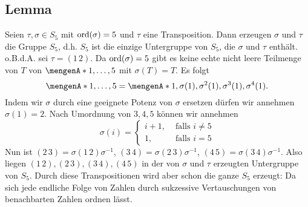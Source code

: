 \subsection[Lemma: Erzeuger von $S_5$]{Lemma} %
\label{sub:230}
Seien $\tau, \sigma \in S_5$ mit $\operatorname{ord}(\sigma)=5$ und $\tau$ eine Transposition. Dann erzeugen $\sigma$ und $\tau$ die Gruppe $S_5$, d.h. $S_5$ ist die einzige Untergruppe
von $S_5$, die $\sigma$ und $\tau$ enthält.
o.B.d.A. sei $\tau = (1 \, 2)$. Da $\operatorname{ord}(\sigma)=5$ gibt es keine echte nicht leere Teilmenge von $T$ von $\set{1,\ldots ,5} $ mit $\sigma(T)=T$. Es folgt 
\[
	\set{1,\ldots ,5} = \set{1, \sigma(1), \sigma^2(1), \sigma^3(1), \sigma^4(1)}.  
\]
Indem wir $\sigma$ durch eine geeignete Potenz von $\sigma$ ersetzen dürfen wir annehmen $\sigma(1)=2$. Nach Umordnung von $3,4,5$ können wir annehmen
\[
	\sigma(i) = \begin{cases}
		i+1, &\text{ falls }i \not= 5\\
		1 , &\text{ falls } i =5
	\end{cases}
\]
Nun ist $ (2 \, 3)= \sigma (1 \, 2) \sigma ^{-1}$, $(3 \, 4) = \sigma (2 \,3) \sigma ^{-1}$, $(4 \, 5) = \sigma (3 \, 4) \sigma ^{-1}$. Also liegen
$(1\, 2), (2 \, 3), (3 \, 4), (4 \, 5)$ in der von $\sigma$ und $\tau$ erzeugten Untergruppe von $S_5$. Durch diese Transpositionen wird aber schon die ganze $S_5$ erzeugt:
Da sich jede endliche Folge von Zahlen durch sukzessive Vertauschungen von benachbarten Zahlen ordnen lässt. \bewende

\cleardoubleoddemptypage
{}
\setcounter{page}{1}
\printindex
\listoffigures
\listoftables

